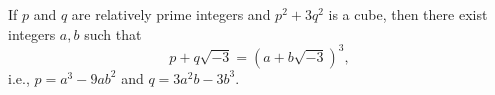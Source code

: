 If $p$ and $q$ are relatively prime integers and $p^2 + 3q^2$ is a cube, then there exist integers $a, b$ such that
$$p + q\sqrt{-3} = (a + b\sqrt{-3})^3,$$
i.e., $p = a^3 - 9ab^2$ and $q = 3a^2b - 3b^3$.
